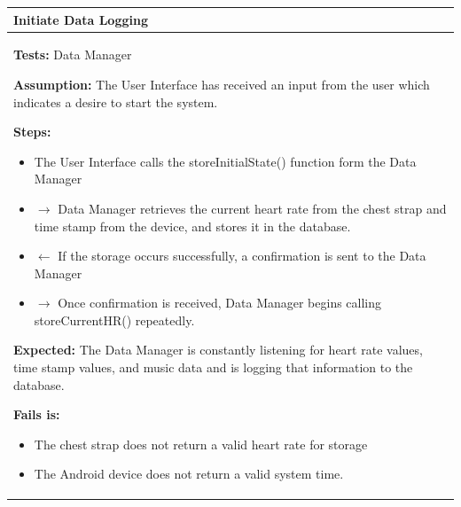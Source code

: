 \documentclass[letterpaper,english, 12pt]{scrreprt}
\begin{document}
\begin{center}
        \begin{tabular}{|C{15cm}|}
                \hline
                        \textbf{Initiate Data Logging} \\
                \hline
                        \begin{flushleft}
                                \textbf{Tests: } Data Manager
                        \end{flushleft}
                        \begin{flushleft}
                                \textbf{Assumption: } The User Interface has received an input from the user which indicates a desire to start the system.
                        \end{flushleft}
                        \begin{flushleft}
                                \textbf{Steps: }
                        \end{flushleft}
                                \begin{itemize}
                                        \item The User Interface calls the storeInitialState() function form the Data Manager
                                        \item $\rightarrow$ Data Manager retrieves the current heart rate from the chest strap and time stamp from the device, and stores it in the database.
                                        \item $\leftarrow$ If the storage occurs successfully, a confirmation is sent to the Data Manager
                                        \item $\rightarrow$ Once confirmation is received, Data Manager begins calling storeCurrentHR() repeatedly.
                                \end{itemize}
                        \begin{flushleft}
                                \textbf{Expected: } The Data Manager is constantly listening for heart rate values, time stamp values, and music data and is logging that information to the database.
                        \end{flushleft}
                        \begin{flushleft}
                                \textbf{Fails is: }
                        \end{flushleft}
                                \begin{itemize}
                                        \item The chest strap does not return a valid heart rate for storage
                                        \item The Android device does not return a valid system time.
                                \end{itemize}
                \hline
        \end{tabular}
\end{center}
\end{document}
